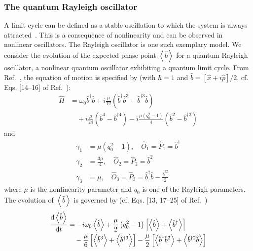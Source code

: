 \documentclass[onecolumn, 12pt, sort&compress]{elsarticle}
\newcommand{\expval}[1]{\left\langle{#1}\right\rangle}
\newcommand{\bop}{\hat{b}}
\newcommand{\bdag}{\bop^\dagger}
\newcommand{\bdagn}[1]{\bop^{\dagger {#1}}}
\begin{document}
\subsubsection{The quantum Rayleigh oscillator}

A limit cycle can be defined as a stable oscillation to which the system is always attracted~\cite{pikovsky_synchronization_2001}. This is a consequence of nonlinearity and can be observed in nonlinear oscillators. The Rayleigh oscillator is one such exemplary model. We consider the evolution of the expected phase point $\expval{\bop}$ for a quantum Rayleigh oscillator, a nonlinear quantum oscillator exhibiting a quantum limit cycle. From Ref.~\cite{chia_relaxation_2020}, the equation of motion is specified by (with $\hbar=1$ and $\bop=\left[\hat{x}+i\hat{p}\right]/2$, cf. Eqs. [14--16] of Ref.~\cite{chia_relaxation_2020}):
\begin{equation}
\begin{split}
    \hat{H} &= \omega_0\bdag\bop + i\frac{\mu}{12}\left(\bdag\bop^3-\bdagn{3}\bop\right) 
    \\
    &\quad + i\frac{\mu}{24}\left(\bop^4-\bdagn{4}\right) - i\frac{\mu\left(q_0^2-1\right)}{4}\left(\bop^2-\bdagn{2}\right)
\end{split}
\end{equation}
and
\begin{subequations}
\begin{align}
    \gamma_1 &= \mu\left(q_0^2-1\right),\quad \hat{O}_1=\hat{P}_1 = \bdag 
    \\
    \gamma_2 &= \frac{3\mu}{4}, \quad \hat{O}_2 = \hat{P}_2=\bop^2
    \\
    \gamma_3 &= \mu, \quad \hat{O}_3=\hat{P}_3 = \bdag\bop - \frac{\bdagn{2}}{2}
\end{align}
\end{subequations}
where $\mu$ is the nonlinearity parameter and $q_0$ is one of the Rayleigh parameters. The evolution of $\expval{\bop}$ is governed by (cf. Eqs. [13, 17--25] of Ref.~\cite{chia_relaxation_2020})
\begin{equation}\label{eq:Rayleigh_expval_evo}
\begin{split}
    \odv{\expval{\bop}}{t} &= -i\omega_0\expval{\bop} + \frac{\mu}{2} \left(q_0^2-1\right) \left[\expval{\bop}+\expval{\bdag}\right] 
    \\
    &\quad -\frac{\mu}{6}\left[\expval{\bop^3}+\expval{\bdagn{3}}\right] - \frac{\mu}{2}\left[\expval{\bdag\bop^2}+\expval{\bdagn{2}\bop}\right]
\end{split}
\end{equation}
\end{document}
